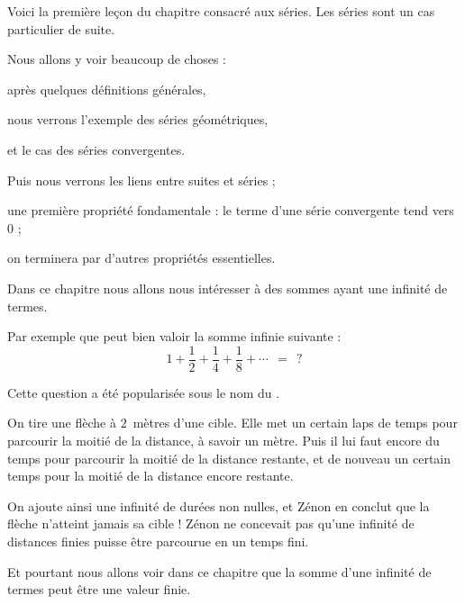 






\debuttexte


\diapo

Voici la première leçon du chapitre consacré aux séries. Les séries sont un cas particulier de suite.

\change
Nous allons y voir beaucoup de choses :

\change
après quelques définitions générales,

\change
nous verrons l'exemple des séries géométriques,

\change
et le cas des séries convergentes.

\change
Puis nous verrons les liens entre suites et séries ;

\change
une première propriété fondamentale : le terme d'une série convergente tend vers 0 ;

on terminera par d'autres propriétés essentielles.

\diapo

Dans ce chapitre nous allons nous intéresser à des sommes ayant une infinité de termes.

\change
Par exemple que peut bien valoir la somme infinie suivante :
\[1+\frac{1}{2} +\frac{1}{4} +\frac{1}{8}+\cdots \ \ = \ \ ? \]

\change
Cette question a été popularisée sous le nom du . 

\change
On tire une flèche à $2$~mètres d'une cible. 
Elle met un certain laps de temps pour parcourir
la moitié de la distance, à savoir un mètre. Puis il lui faut encore du 
temps pour parcourir la moitié de la distance restante, et de nouveau un 
certain temps pour la moitié de la distance encore restante. 

\change
On ajoute ainsi une infinité de durées non nulles, et Zénon en conclut 
que la flèche n'atteint jamais sa cible ! Zénon ne concevait pas qu'une infinité 
de distances finies puisse être parcourue en un temps fini.

\change
Et pourtant nous allons voir dans ce chapitre que la somme d'une infinité de termes
peut être une valeur finie.


\diapo

